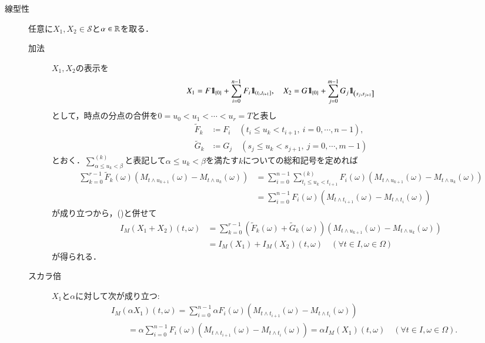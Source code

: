 	\begin{prf}\mbox{}
		\begin{description}
			\item[線型性]
				任意に$X_1,X_2 \in \mathcal{S}$と$\alpha \in \mathbb{R}$を取る．
				\begin{description}
					\item[加法]
						$X_1,X_2$の表示を
						\begin{align}
							X_1 = F \mbox{1}\hspace{-0.25em}\mbox{l}_{\{0\}} + \sum_{i=0}^{n-1} F_i \mbox{1}\hspace{-0.25em}\mbox{l}_{\left(t_i,t_{i+1}\right]},
							\quad X_2 = G \mbox{1}\hspace{-0.25em}\mbox{l}_{\{0\}} + \sum_{j=0}^{m-1} G_j \mbox{1}\hspace{-0.25em}\mbox{l}_{\left(s_j,s_{j+1}\right]}
						\end{align}
						として，時点の分点の合併を$0=u_0 < u_1 < \cdots < u_r = T$と表し
						\begin{align}
							\tilde{F}_k &\coloneqq F_i \quad (t_i \leq u_k < t_{i+1},\ i=0,\cdots,n-1), \\
							\tilde{G}_k &\coloneqq G_j \quad (s_j \leq u_k < s_{j+1},\ j=0,\cdots,m-1)
						\end{align}
						とおく．$\sum_{\alpha \leq u_k < \beta}^{(k)}$と表記して$\alpha \leq u_k < \beta$を満たす$k$についての総和記号を定めれば
						\begin{align}
							\sum_{k=0}^{r-1} \tilde{F}_k(\omega) \left( M_{t \wedge u_{k+1}}(\omega) - M_{t \wedge u_k}(\omega) \right)
							&= \sum_{i=0}^{n-1} \sum_{t_i \leq u_k < t_{i+1}}^{(k)} F_i(\omega) \left( M_{t \wedge u_{k+1}}(\omega) - M_{t \wedge u_k}(\omega) \right) \\
							&= \sum_{i=0}^{n-1} F_i(\omega) \left( M_{t \wedge t_{i+1}}(\omega) - M_{t \wedge t_i}(\omega) \right)
						\end{align}
						が成り立つから，()と併せて
						\begin{align}
							I_M(X_1 + X_2)(t,\omega)
							&= \sum_{k=0}^{r-1} \left( \tilde{F}_k(\omega) + \tilde{G}_k(\omega) \right) \left( M_{t \wedge u_{k+1}}(\omega) - M_{t \wedge u_k}(\omega) \right) \\
							&= I_M(X_1) + I_M(X_2)(t,\omega)
							\quad (\forall t \in I,\omega \in \Omega)
						\end{align}
						が得られる．
					\item[スカラ倍]
						$X_1$と$\alpha$に対して次が成り立つ:
						\begin{align}
							&I_M(\alpha X_1)(t,\omega)
							= \sum_{i=0}^{n-1} \alpha F_i(\omega) \left(M_{t \wedge t_{i+1}}(\omega) - M_{t \wedge t_i}(\omega)\right) \\
							&\qquad= \alpha \sum_{i=0}^{n-1} F_i(\omega) \left(M_{t \wedge t_{i+1}}(\omega) - M_{t \wedge t_i}(\omega)\right)
							= \alpha I_M(X_1)(t,\omega)
							\quad (\forall t \in I,\omega \in \Omega).
						\end{align}
					

\end{description}
\end{description}
\end{prf}
